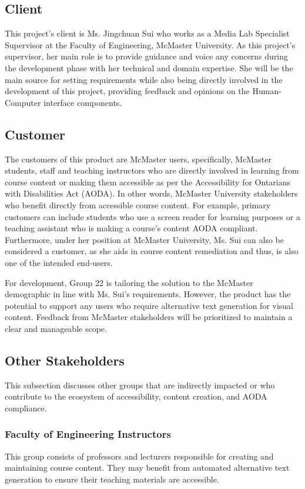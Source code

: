 \documentclass[12pt]{article}
\begin{document}
\subsection{Client}
This project's client is Ms. Jingchuan Sui who works as a Media Lab
Specialist Supervisor at the Faculty of Engineering, McMaster
University. As this project's supervisor, her main role is to provide
guidance and voice any concerns during the development phase with her
technical and domain expertise. She will be the main source for
setting requirements while also being directly involved in the
development of this project, providing feedback and opinions on the
Human-Computer interface components.
\subsection{Customer}
The customers of this product are McMaster users, specifically,
McMaster students, staff and teaching instructors who are directly
involved in learning from course content or making them accessible as per the
Accessibility for Ontarians with Disabilities Act (AODA). In other
words, McMaster University stakeholders who benefit directly from
accessible course content. For
example, primary customers can include students who use a screen reader for
learning purposes or
a teaching assistant who is making a course's content AODA compliant.
Furthermore, under her
position at McMaster University, Ms. Sui can also be considered a
customer, as she aids in course content remediation and thus, is also
one of the intended end-users.
\par For development, Group 22 is tailoring the solution to the
McMaster demographic in line with Ms. Sui’s requirements. However,
the product has the potential to support any users who require
alternative text generation for visual content. Feedback from
McMaster stakeholders will be prioritized to maintain a clear and
manageable scope.
\subsection{Other Stakeholders}
This subsection discusses other groups that are indirectly impacted
or who contribute to the ecosystem of accessibility, content
creation, and AODA compliance.
\subsubsection {Faculty of Engineering Instructors}
This group consists of professors and lecturers responsible for
creating and maintaining
course content. They may benefit from automated alternative text generation
to ensure their teaching materials are accessible.
\end{document}
